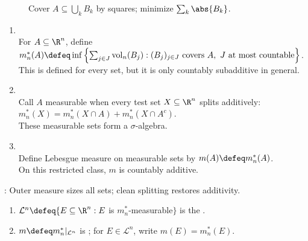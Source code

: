 \begin{figure}[H]
  \centering
  
  \caption{Cover $A\subseteq\bigcup_k B_k$ by squares; minimize $\sum_k\abs{B_k}$.}
  \label{fig:outer-measure-rectangle-cover}
\end{figure}

\begin{method} \label{meth:lebesgue-measure-construction} 
\begin{enumerate}[label=(\roman*)]
\setlength{\itemsep}{0pt}
\item {}\\
For $A\subseteq\R^n$, define $m_n^\ast(A)\defeq\inf\left\{\sum_{j\in J}\operatorname{vol}_n(B_j):(B_j)_{j\in J}\text{ covers }A,\ J\text{ at most countable}\right\}$.\\
This is defined for every set, but it is only countably subadditive in general.
\item {}\\
Call $A$ measurable when every test set $X\subseteq\R^n$ splits additively: $m_n^\ast(X)=m_n^\ast(X\cap A)+m_n^\ast(X\cap A^c)$.\\
These measurable sets form a $\sigma$-algebra.
\item {}\\
Define Lebesgue measure on measurable sets by $m(A)\defeq m_n^\ast(A)$.\\
On this restricted class, $m$ is countably additive.
\end{enumerate}
: Outer measure sizes all sets; clean splitting restores additivity.
\end{method}

\begin{definition} \label{def:lebesgue-sigma-algebra-caratheodory} 
\begin{enumerate}[label=(\roman*)]
\setlength{\itemsep}{0pt}
\item $\mathcal{L}^n\defeq\{E\subseteq\R^n:E$ is $m_n^\ast$-measurable$\}$ is the .
\item $m\defeq m_n^\ast|_{\mathcal{L}^n}$ is ; for $E\in\mathcal{L}^n$, write $m(E)=m_n^\ast(E)$.
\end{enumerate}
\end{definition}

